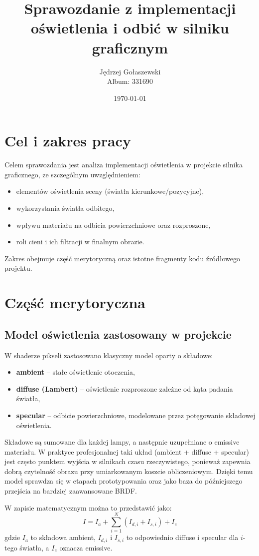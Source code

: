 \documentclass[12pt,a4paper]{article}
\title{Sprawozdanie z implementacji oświetlenia i odbić w silniku graficznym}
\author{Jędrzej Gołaszewski \\ Album: 331690}
\date{\today}
\begin{document}
\maketitle
\tableofcontents
\newpage

\section{Cel i zakres pracy}
Celem sprawozdania jest analiza implementacji oświetlenia w projekcie silnika graficznego, ze szczególnym uwzględnieniem:
\begin{itemize}
  \item elementów oświetlenia sceny (światła kierunkowe/pozycyjne),
  \item wykorzystania światła odbitego,
  \item wpływu materiału na odbicia powierzchniowe oraz rozproszone,
  \item roli cieni i ich filtracji w finalnym obrazie.
\end{itemize}
Zakres obejmuje część merytoryczną oraz istotne fragmenty kodu źródłowego projektu.

\section{Część merytoryczna}
\subsection{Model oświetlenia zastosowany w projekcie}
W shaderze pikseli zastosowano klasyczny model oparty o składowe:
\begin{itemize}
  \item \textbf{ambient} -- stałe oświetlenie otoczenia,
  \item \textbf{diffuse (Lambert)} -- oświetlenie rozproszone zależne od kąta padania światła,
  \item \textbf{specular} -- odbicie powierzchniowe, modelowane przez potęgowanie składowej oświetlenia.
\end{itemize}
Składowe są sumowane dla każdej lampy, a następnie uzupełniane o emissive materiału. W praktyce profesjonalnej taki układ (ambient + diffuse + specular) jest często punktem wyjścia w silnikach czasu rzeczywistego, ponieważ zapewnia dobrą czytelność obrazu przy umiarkowanym koszcie obliczeniowym. Dzięki temu model sprawdza się w etapach prototypowania oraz jako baza do późniejszego przejścia na bardziej zaawansowane BRDF.

W zapisie matematycznym można to przedstawić jako:
\[
I = I_{a} + \sum_{i=1}^{N}\left(I_{d,i} + I_{s,i}\right) + I_{e}
\]
gdzie $I_a$ to składowa ambient, $I_{d,i}$ i $I_{s,i}$ to odpowiednio diffuse i specular dla $i$-tego światła, a $I_e$ oznacza emissive.
\end{document}
